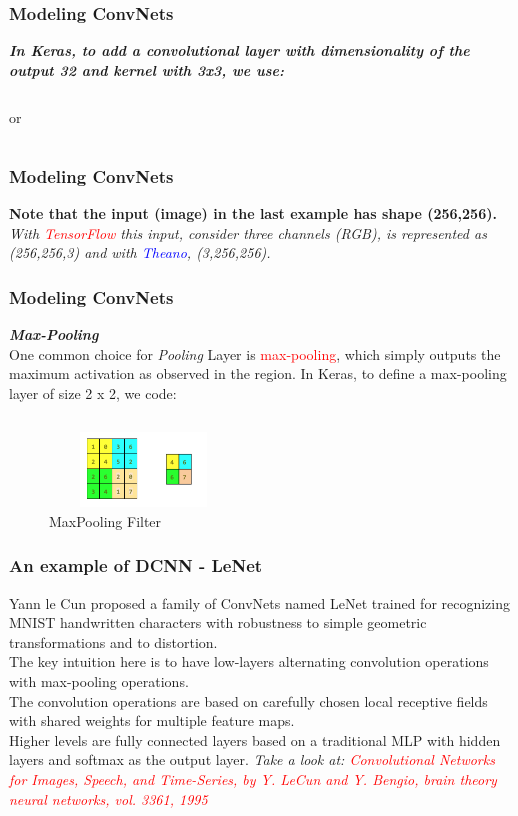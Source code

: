 \documentclass[aspectratio=169]{beamer}
\begin{document}
\begin{frame}
\frametitle{Modeling ConvNets}
\textbf{\emph{In Keras, to add a convolutional layer with dimensionality of the output 32 and kernel with 3x3, we use:}}
\inputminted{python}{twentyfive.py}
or 
\inputminted{python}{twentysix.py}
\end{frame}

\begin{frame}
\frametitle{Modeling ConvNets}
\textbf{Note that the input (image) in the last example has shape (256,256).}
\\[0.3cm]
\emph{With \textcolor{red}{TensorFlow} this input, consider three channels (RGB), is represented as (256,256,3) and with \textcolor{blue}{Theano}, (3,256,256).}
\end{frame}

\begin{frame}
\frametitle{Modeling ConvNets}
\textbf{\emph{Max-Pooling}}
\\[0.1cm]
One  common choice for \emph{Pooling} Layer is \textcolor{red}{max-pooling}, which simply outputs the maximum activation as observed in the region. In Keras, to define a max-pooling layer of size 2 x 2, we code:
\inputminted{python}{twentyseven.py}
\begin{figure}
\includegraphics[width=5cm,height=2cm]{three.jpg}
\caption{MaxPooling Filter}
\label{fig:MaxPooling Filter- Shaped(2x2)}
\end{figure}
\end{frame}

\begin{frame}
\frametitle{An example of DCNN - LeNet}
Yann le Cun proposed  a family of ConvNets named LeNet trained for recognizing MNIST handwritten characters with robustness to simple geometric transformations and to distortion. 
\\[0.3cm]
The key intuition here is to have low-layers alternating convolution operations with max-pooling operations. 
\\[0.3cm]
The convolution operations are based on carefully chosen local receptive fields with shared weights for multiple feature maps. 
\\[0.3cm]
Higher levels are fully connected layers based on a traditional MLP with hidden layers and softmax as the output layer.
\textit{Take a look at: \textcolor{red}{Convolutional Networks for Images, Speech, and Time-Series, by Y. LeCun and Y. Bengio, brain theory neural networks, vol. 3361, 1995}}
\end{frame}
\end{document}
